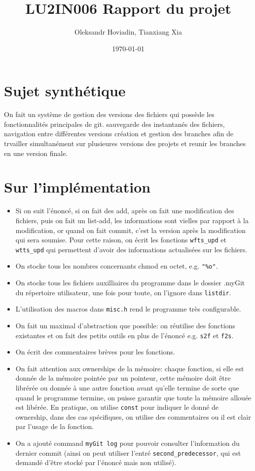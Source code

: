 \documentclass{report}
\title{LU2IN006 Rapport du projet}
\author{Oleksandr Hoviadin, Tianxiang Xia}
\date{\today}
\begin{document}
\maketitle
\section{Sujet synthétique}
On fait un système de gestion des versions des fichiers
qui possède les fonctionnalités principales de git. sauvegarde des instantanés
des fichiers, navigation entre différentes versions
création et gestion des branches afin de trvailler simultanément
sur plusieures versions des projets et reunir les branches
en une version finale.

\section{Sur l'implémentation}
\begin{itemize}
  \item Si on suit l'énoncé, si on fait des add, après on fait une modification des fichiers,
  puis on fait un list-add, les informations sont vielles par rapport à la modification, or quand on
  fait commit, c'est la version après la modification qui sera soumise. Pour cette raison, on écrit les
  fonctions \verb|wfts_upd| et \verb|wtts_upd| qui permettent d'avoir des informations actualisées sur
  les fichiers.
  \item On stocke tous les nombres concernants chmod en octet, e.g. \verb|"%o"|.
  \item On stocke tous les fichiers auxilliaires du programme dans le dossier .myGit
  du répertoire utilisateur, une fois pour toute, on l'ignore dans \verb|listdir|.
  \item L'utilisation des macros dans \verb|misc.h| rend le programme très configurable.
  \item On fait un maximal d'abstraction que possible: on réutilise des fonctions existantes et
  on fait des petits outils en plus de l'énoncé e.g. \verb|s2f| et \verb|f2s|.
  \item On écrit des commentaires brèves pour les fonctions.
  \item On fait attention aux ownerships de la mémoire: chaque fonction, si elle est donnée de la mémoire pointée
  par un pointeur, cette mémoire doit être librérée ou donnée à une autre fonction avant qu'elle termine de sorte
  que quand le programme termine, on puisse garantir que toute la mémoire allouée est libérée. En pratique, on utilise
  \verb|const| pour indiquer le donné de ownership, dans des cas spécifiques, on utilise des commentaires ou il est
  clair par l'usage de la fonction.
  \item On a ajouté command \verb|myGit log| pour pouvoir consulter l'information du dernier commit (ainsi on
  peut utiliser l'entré \verb|second_predecessor|, qui est demandé d'être stocké par l'énoncé mais non utilisé).
\end{itemize}
\end{document}
